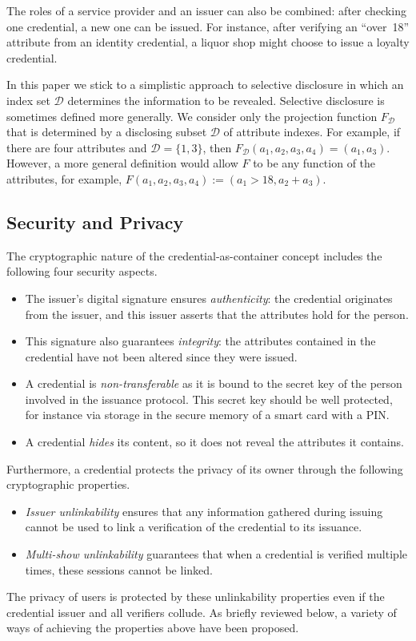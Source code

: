The roles of a service provider and an issuer can also be combined: after
checking one credential, a new one can be issued. For instance, after verifying
an ``over~18'' attribute from an identity credential, a liquor shop might choose
to issue a loyalty credential.

In this paper we stick to a simplistic approach to selective disclosure in which
an index set $\mathcal{D}$ determines the information to be revealed. Selective
disclosure is sometimes defined more generally. We consider only the projection
function $F_{\mathcal{D}}$ that is determined by a disclosing subset
$\mathcal{D}$ of attribute indexes. For example, if there are four attributes
and $\mathcal{D}=\{1,3\}$, then
$F_{\mathcal{D}}(a_1, a_2, a_3, a_4)= (a_1, a_3)$. However, a more general
definition would allow $F$ to be any function of the attributes, for example,
$F(a_1, a_2, a_3, a_4):=(a_1>18, a_2+a_3)$.

\subsection{Security and Privacy}

The cryptographic nature of the credential-as-container concept includes the
following four security aspects.
\begin{itemize}
  \item The issuer's digital signature ensures \emph{authenticity}: the
    credential originates from the issuer, and this issuer asserts that the
    attributes hold for the person.
  \item This signature also guarantees \emph{integrity}: the attributes
    contained in the credential have not been altered since they were issued.
  \item A credential is \emph{non-transferable} as it is bound to the secret
    key of the person involved in the issuance protocol. This secret key should
    be well protected, for instance via storage in the secure memory of a smart
    card with a PIN.
  \item A credential \emph{hides} its content, so it does not reveal the
    attributes it contains.
\end{itemize}
Furthermore, a credential protects the privacy of its owner through the
following cryptographic properties.
\begin{itemize}
  \item \emph{Issuer unlinkability} ensures that any information gathered
    during issuing cannot be used to link a verification of the credential to
    its issuance.
  \item \emph{Multi-show unlinkability} guarantees that when a credential is
    verified multiple times, these sessions cannot be linked.
\end{itemize}
The privacy of users is protected by these unlinkability properties even if the
credential issuer and all verifiers collude. As briefly reviewed below, a
variety of ways of achieving the properties above have been proposed.

